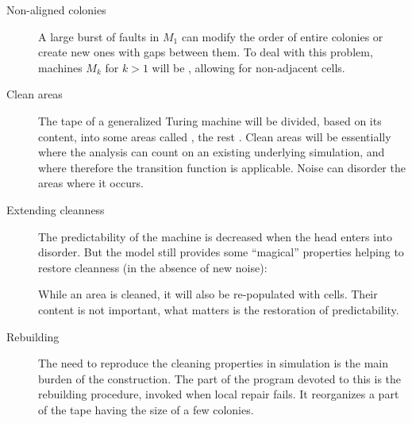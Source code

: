 \documentclass[11pt]{memoir}
\theoremstyle{definition} %
\begin{document}
\begin{description}

\item[Non-aligned colonies] A large burst of faults in \( M_{1} \) can modify the order of
entire colonies or create new ones with gaps between them.
To deal with this problem, machines \( M_{k} \) for \( k>1 \)
will be , allowing for non-adjacent cells.

\item[Clean areas]
  The tape of a generalized Turing machine will be divided, based on its content, into
  some areas called , the rest .
  Clean areas will be essentially where the analysis
  can count on an existing underlying simulation,
  and where therefore the transition function is applicable.
  Noise can disorder the areas where it occurs.

\item[Extending cleanness]
  The predictability of the machine is decreased when the head enters into disorder.
  But the model still provides some ``magical'' properties
  helping to restore cleanness (in the absence of new noise):
While an area is cleaned, it will also be re-populated with cells.
Their content is not important, what matters is the restoration of predictability.

\item[Rebuilding]
The need to reproduce the cleaning properties in simulation is the
main burden of the construction.
The part of the program devoted to this is the rebuilding procedure,
invoked when local repair fails.
  It reorganizes a part of the tape having the size of a few colonies.
\end{description}


\end{document}
